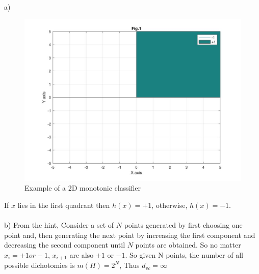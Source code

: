 \documentclass[12pt]{article}
\begin{document}
\newpage
{} \\\\
\indent a) \begin{figure}[H]
  \centering
  \includegraphics[scale = 0.35]{Pic1.jpg}
  \caption{Example of a 2D monotonic classifier}
  \label{fig:Pic1}
\end{figure}
\indent If $x$ lies in the first quadrant then $h(x) = +1$, otherwise, $h(x) = -1$.\\\\
\indent b) From the hint, Consider a set of $N$ points generated by first choosing one point and, then generating the next point by increasing the first component and decreasing the second component until $N$ points are obtained. So no matter $x_i = +1 or -1$, $x_{i+1}$ are also $+1$ or $-1$. So given N points, the number of all possible dichotomies is $m(H) = 2^N$, Thus $d_{vc} = \infty$\\\\
\end{document}
